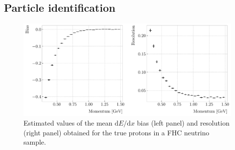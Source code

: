 \subsection{Particle identification}

\begin{figure}[t]
	\centering
	\includegraphics[width=.90\linewidth]{Images/GArSoft_PID/dEdx/proton_dEdx_momentum.pdf}
	\caption[Estimated values of the mean $\mathrm{d}E/\mathrm{d}x$ bias and resolution obtained for the true protons in a FHC neutrino sample.]{Estimated values of the mean $\mathrm{d}E/\mathrm{d}x$ bias (left panel) and resolution (right panel) obtained for the true protons in a FHC neutrino sample.}
	\label{fig:proton_dEdx_momentum}
\end{figure}

